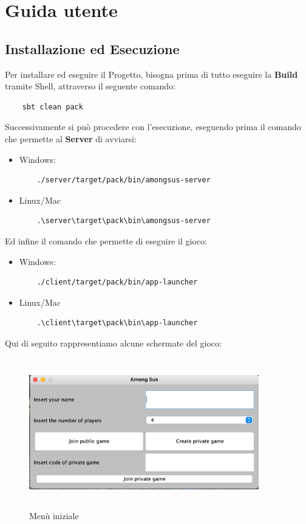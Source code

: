\chapter{Guida utente}

\section{Installazione ed Esecuzione}

Per installare ed eseguire il Progetto, bisogna prima di tutto eseguire la \textbf{Build} tramite Shell, attraverso il seguente comando: 
\begin{verbatim}
    sbt clean pack
\end{verbatim}
Successivamente si pu\`o procedere con l'esecuzione, eseguendo prima il comando che permette al \textbf{Server} di avviarsi:
\begin{itemize}
    \item Windows: \begin{verbatim}
    ./server/target/pack/bin/amongsus-server
\end{verbatim}
    \item Linux/Mac \begin{verbatim}
    .\server\target\pack\bin\amongsus-server
\end{verbatim}
\end{itemize}
Ed infine il comando che permette di eseguire il gioco:
\begin{itemize}
    \item Windows: \begin{verbatim}
    ./client/target/pack/bin/app-launcher
\end{verbatim}
    \item Linux/Mac \begin{verbatim}
    .\client\target\pack\bin\app-launcher
\end{verbatim}
\end{itemize}
Qui di seguito rappresentiamo alcune schermate del gioco:

\begin{figure}[ht]
\centering
\includegraphics[width=10cm, height=6.5cm]{img/menu-frame.jpeg}
\caption{Men\`u iniziale} 
\end{figure}

